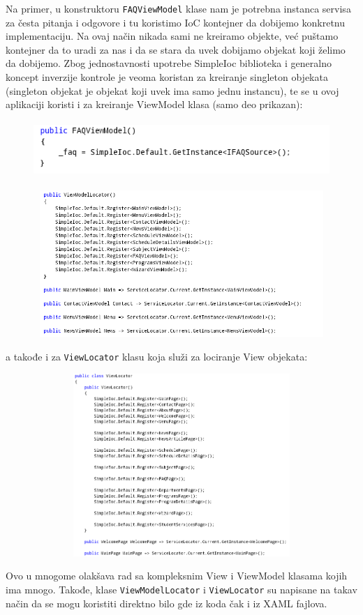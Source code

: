 \documentclass[a4paper]{article}
\begin{document}
Na primer, u konstruktoru
\texttt{\textcolor[rgb]{0.0,0.4,0.8}{FAQViewModel}} klase nam je
potrebna instanca servisa za česta pitanja i odgovore i tu koristimo
IoC kontejner da dobijemo konkretnu implementaciju. Na ovaj način
nikada sami ne kreiramo objekte, već puštamo kontejner da to uradi za
nas i da se stara da uvek dobijamo objekat koji želimo da dobijemo.
Zbog jednostavnosti upotrebe SimpleIoc biblioteka i generalno koncept
inverzije kontrole je veoma koristan za kreiranje singleton objekata
(singleton objekat je objekat koji uvek ima samo jednu instancu), te se
u ovoj aplikaciji koristi i za kreiranje ViewModel klasa (samo deo
prikazan):

\begin{figure}
\centering
\includegraphics[width=128.85mm,height=21.31mm]{msc-img41.png}
\end{figure}
 

\begin{figure}
\centering
\includegraphics[width=170mm,height=55.65mm]{msc-img42.png}
\end{figure}
a takođe i za \texttt{\textcolor[rgb]{0.0,0.4,0.8}{ViewLocator}} klasu
koja služi za lociranje View objekata:



\begin{figure}
\centering
\includegraphics[width=150.67mm,height=69.39mm]{msc-img43.png}
\end{figure}
Ovo u mnogome olakšava rad sa kompleksnim View i ViewModel klasama kojih
ima mnogo. Takođe, klase
\texttt{\textcolor[rgb]{0.0,0.4,0.8}{ViewModelLocator}} i
\texttt{\textcolor[rgb]{0.0,0.4,0.8}{ViewLocator}} su napisane na takav
način da se mogu koristiti direktno bilo gde iz koda čak i iz XAML
fajlova.
\end{document}
